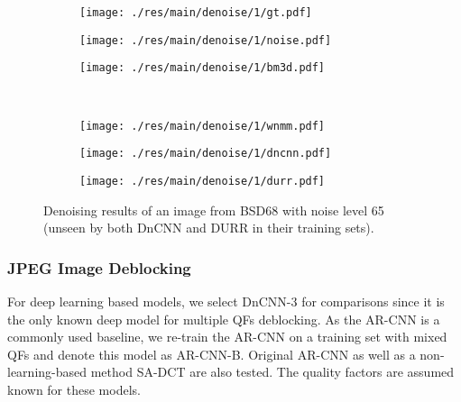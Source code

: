 \documentclass{article} %
\begin{document}
\begin{figure}[htp!]
	\centering
	\begin{subfigure}[t]{0.3\textwidth}
		\centering
		\texttt{[image: ./res/main/denoise/1/gt.pdf]}
	\end{subfigure}
	\quad
	\begin{subfigure}[t]{0.3\textwidth}
		\centering
		\texttt{[image: ./res/main/denoise/1/noise.pdf]}
	\end{subfigure}
	\quad
	\begin{subfigure}[t]{0.3\textwidth}
		\centering
		\texttt{[image: ./res/main/denoise/1/bm3d.pdf]}
	\end{subfigure}\\
	\begin{subfigure}[t]{0.3\textwidth}
		\centering
		\texttt{[image: ./res/main/denoise/1/wnmm.pdf]}
	\end{subfigure}
	\quad
	\begin{subfigure}[t]{0.3\textwidth}
		\centering
		\texttt{[image: ./res/main/denoise/1/dncnn.pdf]}
	\end{subfigure}
	\quad
	\begin{subfigure}[t]{0.3\textwidth}
		\centering
		\texttt{[image: ./res/main/denoise/1/durr.pdf]}
	\end{subfigure}
	\caption{Denoising results of an image from BSD68 with
		noise level 65 (unseen by both DnCNN and DURR in their
		training sets).}
	\label{test2}
\end{figure}


\normalsize

\subsubsection{JPEG Image Deblocking}
For deep learning based models, we select DnCNN-3 \citep{zhang2017beyond}
for comparisons since it is the only known deep model for multiple QFs deblocking.
As the AR-CNN \citep{dong2015compression} is a commonly used baseline, we re-train
the AR-CNN on a training set with mixed QFs and denote this model as AR-CNN-B.
Original AR-CNN as well as a non-learning-based method SA-DCT
\citep{foi2007pointwise} are also tested. The quality factors are assumed known
for these models.
\end{document}
